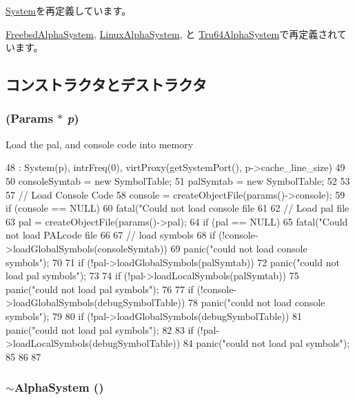 \hyperlink{classSystem_a5f461be6222ce76bffcb70f27d820c56}{System}を再定義しています。

\hyperlink{classFreebsdAlphaSystem_a0cee38b7e957f9f434ee078d80b94d1b}{FreebsdAlphaSystem}, \hyperlink{classLinuxAlphaSystem_a0d8e2379ed014b6039c45eb98c24fed4}{LinuxAlphaSystem}, と \hyperlink{classTru64AlphaSystem_a653e3d38e55079cc093cc4945c1ac3d1}{Tru64AlphaSystem}で再定義されています。

\subsection{コンストラクタとデストラクタ}
\hypertarget{classAlphaSystem_a941905a366151e2723f8e98ffd40cadb}{
\subsubsection[{AlphaSystem}]{ ({\bf Params} $\ast$ {\em p})}}
\label{classAlphaSystem_a941905a366151e2723f8e98ffd40cadb}


Load the pal, and console code into memory


\begin{DoxyCode}
48     : System(p), intrFreq(0), virtProxy(getSystemPort(), p->cache_line_size)
49 {
50     consoleSymtab = new SymbolTable;
51     palSymtab = new SymbolTable;
52 
53 
57     // Load Console Code
58     console = createObjectFile(params()->console);
59     if (console == NULL)
60         fatal("Could not load console file %
61 
62     // Load pal file
63     pal = createObjectFile(params()->pal);
64     if (pal == NULL)
65         fatal("Could not load PALcode file %
66 
67     // load symbols
68     if (!console->loadGlobalSymbols(consoleSymtab))
69         panic("could not load console symbols\n");
70 
71     if (!pal->loadGlobalSymbols(palSymtab))
72         panic("could not load pal symbols\n");
73 
74     if (!pal->loadLocalSymbols(palSymtab))
75         panic("could not load pal symbols\n");
76 
77     if (!console->loadGlobalSymbols(debugSymbolTable))
78         panic("could not load console symbols\n");
79 
80     if (!pal->loadGlobalSymbols(debugSymbolTable))
81         panic("could not load pal symbols\n");
82 
83     if (!pal->loadLocalSymbols(debugSymbolTable))
84         panic("could not load pal symbols\n");
85 
86 
87 }
\end{DoxyCode}
\hypertarget{classAlphaSystem_a95eeeeee39ef2bc37d8fc8ffc3b1cdbe}{
\subsubsection[{$\sim$AlphaSystem}]{\setlength{\rightskip}{0pt plus 5cm}$\sim${\bf AlphaSystem} ()}}
\label{classAlphaSystem_a95eeeeee39ef2bc37d8fc8ffc3b1cdbe}



